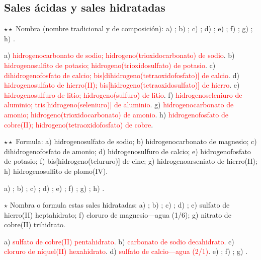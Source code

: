 \subsection{Sales ácidas y sales hidratadas}

\begin{exercise}
    \(\star\star\) Nombra (nombre tradicional y de composición): a) ; b) ; c) ; d)
    ; e) ; f) ; g) ; h) .
    \begin{solu}
        a) \textcolor{red}{hidrogenocarbonato de sodio; hidrogeno(trioxidocarbonato) de sodio}. b) \textcolor{red}{hidrogenosulfito
        de potasio; hidrogeno(trioxidosulfato) de potasio}. c) \textcolor{red}{dihidrogenofosfato de calcio;
        bis[dihidrogeno(tetraoxidofosfato)] de calcio}. d) \textcolor{red}{hidrogenosulfato de hierro(II);
        bis[hidrogeno(tetraoxidosulfato)] de hierro}. e) \textcolor{red}{hidrogenosulfuro de litio; hidrogeno(sulfuro) de litio}.
        f) \textcolor{red}{hidrogenoseleniuro de aluminio; tris[hidrogeno(seleniuro)] de aluminio}. g)
        \textcolor{red}{hidrogenocarbonato de amonio; hidrogeno(trioxidocarbonato) de amonio}. h) \textcolor{red}{hidrogenofosfato
        de cobre(II); hidrogeno(tetraoxidofosfato) de cobre}.
    \end{solu}
\end{exercise}

\begin{exercise}
    \(\star\star\) Formula: a) hidrogenosulfato de sodio; b) hidrogenocarbonato de magnesio; c) dihidrogenofosfato de amonio; d)
    hidrogenosulfuro de calcio; e) hidrogenofosfato de potasio; f) bis[hidrogeno(telururo)] de cinc; g) hidrogenoarseniato de
    hierro(II); h) hidrogenosulfito de plomo(IV).
    \begin{solu}
        a) \textcolor{red}{}; b) \textcolor{red}{}; c) \textcolor{red}{}; d)
        \textcolor{red}{}; e) \textcolor{red}{}; f) \textcolor{red}{}; g)
        \textcolor{red}{}; h) \textcolor{red}{}.
    \end{solu}
\end{exercise}

\begin{exercise}
    \(\star\) Nombra o formula estas sales hidratadas: a) ; b) ; c) ; d)
    ; e) sulfato de hierro(II) heptahidrato; f) cloruro de magnesio---agua (1/6); g) nitrato de cobre(II)
    trihidrato.
    \begin{solu}
        a) \textcolor{red}{sulfato de cobre(II) pentahidrato}. b) \textcolor{red}{carbonato de sodio decahidrato}. c)
        \textcolor{red}{cloruro de níquel(II) hexahidrato}. d) \textcolor{red}{sulfato de calcio---agua (2/1)}. e)
        \textcolor{red}{}; f) \textcolor{red}{}; g) \textcolor{red}{}.
    \end{solu}
\end{exercise}

